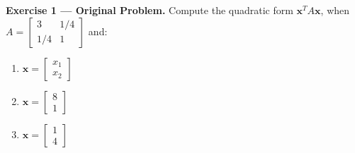\documentclass[11pt, letterpaper]{article}
\theoremstyle{definition}
\theoremstyle{remark}
\begin{document}
\textbf{Exercise 1 --- Original Problem.} Compute the quadratic form $\mathbf{x}^T A \mathbf{x}$, when $A = \begin{bmatrix} 3 & 1/4 \\ 1/4 & 1 \end{bmatrix}$ and:
\begin{enumerate}[label=\alph*.]
    \item $\mathbf{x} = \begin{bmatrix} x_1 \\ x_2 \end{bmatrix}$
    \item $\mathbf{x} = \begin{bmatrix} 8 \\ 1 \end{bmatrix}$
    \item $\mathbf{x} = \begin{bmatrix} 1 \\ 4 \end{bmatrix}$
\end{enumerate}
\end{document}
